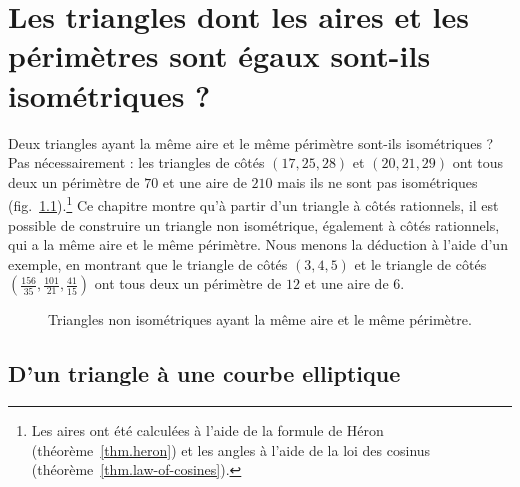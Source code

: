 \chapter{Les triangles dont les aires et les périmètres sont égaux sont-ils isométriques ?}\label{c.congruent}



Deux triangles ayant la même aire et le même périmètre sont-ils isométriques ? Pas nécessairement : les triangles de côtés $(17,25,28)$ et $(20,21,29)$ ont tous deux un périmètre de $70$ et une aire de $210$ mais ils ne sont pas isométriques (fig.~\ref{f.congruent-first-example}).\footnote{Les aires ont été calculées à l'aide de la formule de Héron (théorème~\ref{thm.heron}) et les angles à l'aide de la loi des cosinus (théorème~\ref{thm.law-of-cosines}).} Ce chapitre montre qu'à partir d'un triangle à côtés rationnels, il est possible de construire un triangle non isométrique, également à côtés rationnels, qui a la même aire et le même périmètre.
Nous menons la déduction à l'aide d'un exemple, en montrant que le triangle de côtés $(3,4,5)$ et le triangle de côtés 
$\left(\frac{156}{35}, \frac{101}{21}, \frac{41}{15}\right)$  ont tous deux un périmètre de $12$ et une aire de $6$.

\begin{figure}[htbp]
\centering
{}

\caption{Triangles non isométriques ayant la même aire et le même périmètre.}\label{f.congruent-first-example}
\end{figure}


\section{D'un triangle à une courbe elliptique}\label{s.elliptic}

